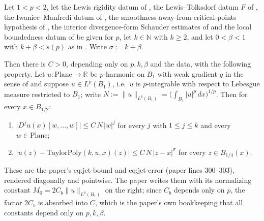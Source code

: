 \begin{lemma}
Let $1<p<2$, let the Lewis rigidity datum of , the Lewis--Tolksdorf
datum $F$ of , the Iwaniec--Manfredi datum of
, the smoothness-away-from-critical-points hypothesis of
, the interior divergence-form Schauder estimates of
 and the local boundedness datum of
 be given for $p$, let $k\in\mathbb{N}$ with $k\ge2$, and let
$0<\beta<1$ with $k+\beta<s(p)$ as in .  Write $\sigma:=k+\beta$.

Then there is $C>0$, depending only on $p,k,\beta$ and the data, with the following property.
Let $u\colon\mathrm{Plane}\to\mathbb{R}$ be $p$-harmonic on $B_1$ with weak gradient $g$ in the
sense of  and suppose $u\in L^{p}(B_1)$, i.e.\ $u$ is $p$-integrable with
respect to Lebesgue measure restricted to $B_1$; write
$N:=\lVert u\rVert_{L^{p}(B_1)}=\bigl(\int_{B_1}\lvert u\rvert^{p}\,dx\bigr)^{1/p}$.  Then for every $x\in B_{1/2}$:
\begin{enumerate}
\item $\bigl\lvert D^{j}u(x)[w,\ldots,w]\bigr\rvert\le C\,N\,\lvert w\rvert^{j}$ for every $j$
  with $1\le j\le k$ and every $w\in\mathrm{Plane}$;
\item $\bigl\lvert u(z)-\mathrm{TaylorPoly}(k,u,x)(z)\bigr\rvert
  \le C\,N\,\lvert z-x\rvert^{\sigma}$ for every $z\in B_{1/4}(x)$.
\end{enumerate}

These are the paper's eq:jet-bound and eq:jet-error (paper lines 300--303), rendered
diagonally and pointwise.  The paper writes them with its normalizing constant
$M_0=2C_b\lVert u\rVert_{L^{p}(B_1)}$ on the right; since $C_b$ depends only on $p$, the factor
$2C_b$ is absorbed into $C$, which is the paper's own bookkeeping that all constants depend only
on $p,k,\beta$.
\end{lemma}

